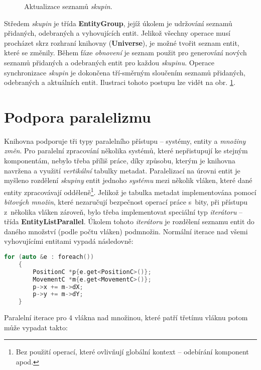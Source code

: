 \begin{figure}[H]
	\begin{center}
	\end{center}
	\caption{Aktualizace seznamů \emph{skupin}.}
	\label{Fig:IMPLMerge}
\end{figure}

Středem \emph{skupin} je třída \textbf{EntityGroup}, jejíž úkolem je udržování seznamů přidaných, odebraných a vyhovujících entit. Jelikož všechny operace musí procházet skrz rozhraní knihovny (\textbf{Universe}), je možné tvořit seznam entit, které se změnily. Během fáze \emph{obnovení} je seznam použit pro generování nových seznamů přidaných a odebraných entit pro každou \emph{skupinu}. Operace synchronizace \emph{skupin} je dokončena tří-směrným sloučením seznamů přidaných, odebraných a aktuálních entit. Ilustraci tohoto postupu lze vidět na obr. \ref{Fig:IMPLMerge}.

\section{Podpora paralelizmu}

Knihovna podporuje tři typy paralelního přístupu -- systémy, entity a \emph{množiny změn}. Pro paralelní zpracování několika systémů, které nepřistupují ke stejným komponentám, nebylo třeba příliš práce, díky způsobu, kterým je knihovna navržena a využití \emph{vertikální} tabulky metadat. Paralelizací na úrovni entit je myšleno rozdělení \emph{skupiny} entit jednoho \emph{systému} mezi několik vláken, které dané entity zpracovávají odděleně\footnote{Bez použití operací, které ovlivňují globální kontext -- odebírání komponent apod.}. Jelikož je tabulka metadat implementována pomocí \emph{bitových množin}, které nezaručují bezpečnost operací práce s~bity, při přístupu z~několika vláken zároveň, bylo třeba implementovat speciální typ \emph{iterátoru} -- třída \textbf{EntityListParallel}. Úkolem tohoto \emph{iterátoru} je rozdělení seznamu entit do daného množství (podle počtu vláken) podmnožin. Normální iterace nad všemi vyhovujícími entitami vypadá následovně:

\begin{lstlisting}[language=C++]
	for (auto &e : foreach())
	{
	    PositionC *p{e.get<PositionC>()};
	    MovementC *m{e.get<MovementC>()};
	    p->x += m->dX;
	    p->y += m->dY;
	}
\end{lstlisting}

\noindent Paralelní iterace pro 4 vlákna nad množinou, které patří třetímu vláknu potom může vypadat takto:

